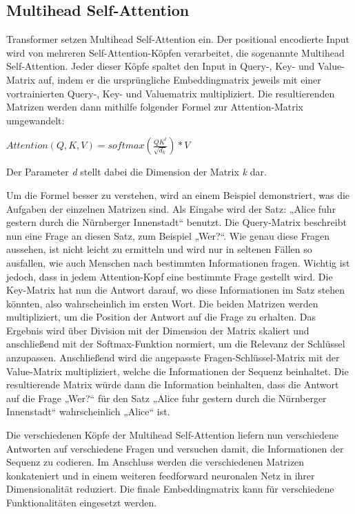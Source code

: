 \subsection{Multihead Self-Attention}

Transformer setzen Multihead Self-Attention ein.
Der positional encodierte Input wird von mehreren Self-Attention-Köpfen verarbeitet, die sogenannte Multihead Self-Attention.
Jeder dieser Köpfe spaltet den Input in Query-, Key- und Value-Matrix auf, indem er die ursprüngliche Embeddingmatrix jeweils mit einer vortrainierten Query-, Key- und Valuematrix multipliziert.
Die resultierenden Matrizen werden dann mithilfe folgender Formel zur Attention-Matrix umgewandelt:

$Attention(Q,K,V)=softmax(\frac{QK^t}{\sqrt{d_k}})*V$

Der Parameter \textit{d} stellt dabei die Dimension der Matrix \textit{k} dar.

Um die Formel besser zu verstehen, wird an einem Beispiel demonstriert, was die Aufgaben der einzelnen Matrizen sind.
Als Eingabe wird der Satz: „Alice fuhr gestern durch die Nürnberger Innenstadt“ benutzt.
Die Query-Matrix beschreibt nun eine Frage an diesen Satz, zum Beispiel „Wer?“.
Wie genau diese Fragen aussehen, ist nicht leicht zu ermitteln und wird nur in seltenen Fällen so ausfallen, wie auch Menschen nach bestimmten Informationen fragen.
Wichtig ist jedoch, dass in jedem Attention-Kopf eine bestimmte Frage gestellt wird.
Die Key-Matrix hat nun die Antwort darauf, wo diese Informationen im Satz stehen könnten, also wahrscheinlich im ersten Wort.
Die beiden Matrizen werden multipliziert, um die Position der Antwort auf die Frage zu erhalten.
Das Ergebnis wird über Division mit der Dimension der Matrix skaliert und anschließend mit der Softmax-Funktion normiert, um die Relevanz der Schlüssel anzupassen.
Anschließend wird die angepasste Fragen-Schlüssel-Matrix mit der Value-Matrix multipliziert, welche die Informationen der Sequenz beinhaltet.
Die resultierende Matrix würde dann die Information beinhalten, dass die Antwort auf die Frage „Wer?“ für den Satz „Alice fuhr gestern durch die Nürnberger Innenstadt“ wahrscheinlich „Alice“ ist.~\cite{ng2023}

Die verschiedenen Köpfe der Multihead Self-Attention liefern nun verschiedene Antworten auf verschiedene Fragen und versuchen damit, die Informationen der Sequenz zu codieren.
Im Anschluss werden die verschiedenen Matrizen konkateniert und in einem weiteren feedforward neuronalen Netz in ihrer Dimensionalität reduziert.
Die finale Embeddingmatrix kann für verschiedene Funktionalitäten eingesetzt werden.


